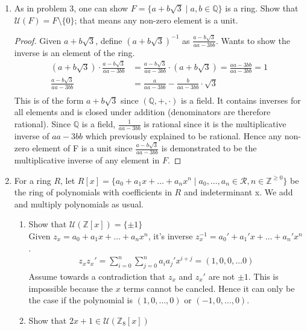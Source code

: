 \documentclass[12pt]{article}
\begin{document}
\begin{enumerate}
	\item As in problem 3, one can show $F=\{a+b\sqrt{3} \mid a,b\in\mathbb{Q}\}$
		is a ring. Show that $\mathcal{U}(F) = F \setminus \{0\}$; that means any
		non-zero element is a unit.
		\begin{proof}
			Given $a + b\sqrt{3}$, define $(a + b\sqrt{3})^{-1}$ as $\frac{a -
				b\sqrt{3}}{aa - 3bb}$. Wants to show the inverse is an element of the ring.
			\begin{align*}
				(a + b\sqrt{3})\cdot \frac{a - b\sqrt{3}}{aa - 3bb} &= \frac{a -
					b\sqrt{3}}{aa - 3bb}\cdot(a + b\sqrt{3}) =\frac{aa - 3bb}{aa - 3bb} =
					1\\
					\frac{a - b\sqrt{3}}{aa - 3bb} &= \frac{a}{aa-3bb} - \frac{b}{aa-3bb}
					\cdot \sqrt{3}\\
			\end{align*}
			This is of the form $a + b\sqrt{3}$ since $(\mathbb{Q}, +, \cdot)$ is a
			field. It contains inverses for all elements and is closed under addition 
			(denominators are therefore rational). Since $\mathbb{Q}$ is a field,
			$\frac{1}{aa - 3bb}$ is rational since it is the multiplicative inverse of
			$aa - 3bb$ which previously explained to be rational. Hence any non-zero
			element of F is a unit since $\frac{a - b\sqrt{3}}{aa - 3bb}$ is
			demonstrated to be the multiplicative inverse of any element in $F$.
		\end{proof}

	\item For a ring $R$, let $R[x] = \{a_0 + a_1x + \dots + a_nx^n \mid a_0,
		\dots, a_n \in \mathcal{R}, n \in \mathbb{Z}^{\ge 0}\}$ be the ring of
		polynomials with coefficients in $R$ and indeterminant x. We add and
		multiply polynomials as usual.
		\begin{enumerate}
			\item Show that $\mathcal{U}(\mathbb{Z}[x]) = \{\pm 1\}$ \\
				Given $z_x = a_0 + a_1x + \dots + a_nx^n$, it's inverse 
				$z_x^{-1} = a_0' + a_1'x + \dots + a_n'x^n$.
				\begin{align*}
					z_xz_x' = \sum^n_{i=0}\sum^n_{j=0} a_ia_j'x^{i+j} = (1,0, 0, \dots 0)
				\end{align*}
				Assume towards a contradiction that $z_x$ and $z_x'$ are not $\pm 1$.
				This is impossible because the $x$ terms cannot be cancled. Hence it can
				only be the case if the polynomial is $(1, 0, \dots, 0)$ or $(-1, 0,
				\dots, 0)$.

			\item Show that $2x+1 \in \mathcal{U}(\mathbb{Z}_8[x])$


\end{enumerate}
\end{enumerate}
\end{document}
